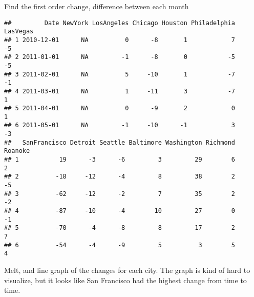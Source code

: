 \documentclass[
]{article}
\newenvironment{Shaded}{\begin{snugshade}}{\end{snugshade}}
\newcommand{\AttributeTok}[1]{\textcolor[rgb]{0.77,0.63,0.00}{#1}}
\newcommand{\DecValTok}[1]{\textcolor[rgb]{0.00,0.00,0.81}{#1}}
\newcommand{\FunctionTok}[1]{\textcolor[rgb]{0.00,0.00,0.00}{#1}}
\newcommand{\NormalTok}[1]{#1}
\newcommand{\OtherTok}[1]{\textcolor[rgb]{0.56,0.35,0.01}{#1}}
\newcommand{\SpecialCharTok}[1]{\textcolor[rgb]{0.00,0.00,0.00}{#1}}
\begin{document}
Find the first order change, difference between each month

\begin{Shaded}
\end{Shaded}

\begin{verbatim}
##         Date NewYork LosAngeles Chicago Houston Philadelphia LasVegas
## 1 2010-12-01      NA          0      -8       1            7       -5
## 2 2011-01-01      NA         -1      -8       0           -5       -5
## 3 2011-02-01      NA          5     -10       1           -7       -1
## 4 2011-03-01      NA          1     -11       3           -7        1
## 5 2011-04-01      NA          0      -9       2            0        1
## 6 2011-05-01      NA         -1     -10      -1            3       -3
##   SanFrancisco Detroit Seattle Baltimore Washington Richmond Roanoke
## 1           19      -3      -6         3         29        6       2
## 2          -18     -12      -4         8         38        2      -5
## 3          -62     -12      -2         7         35        2      -2
## 4          -87     -10      -4        10         27        0      -1
## 5          -70      -4      -8         8         17        2       7
## 6          -54      -4      -9         5          3        5       4
\end{verbatim}

Melt, and line graph of the changes for each city. The graph is kind of
hard to visualize, but it looks like San Francisco had the highest
change from time to time.
\end{document}

